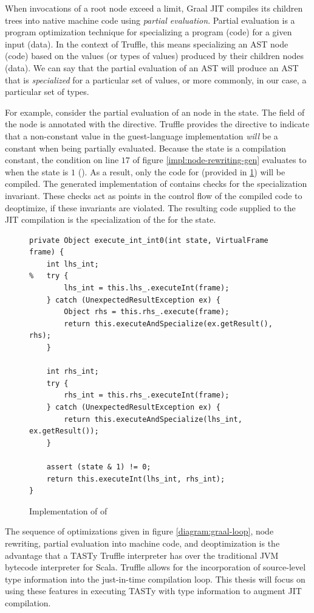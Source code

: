 When invocations of a root node exceed a limit, Graal JIT compiles its children trees into native machine code using \textit{partial evaluation}.
Partial evaluation is a program optimization technique for specializing a program (code) for a given input (data)\cite{futamura:partial-eval}.
In the context of Truffle, this means specializing an AST node (code) based on the values (or types of values) produced by their children nodes (data)\cite{truffle:partial-eval}.
We can say that the partial evaluation of an AST  will produce an AST that is \textit{specialized} for a particular set of values, or more commonly, in our case, a particular set of types.

For example, consider the partial evaluation of an  node in the  state.
The  field of the node is annotated with the  directive.
Truffle provides the  directive to indicate that a non-constant value in the guest-language implementation \textit{will} be a constant when being partially evaluated.
Because the state is a compilation constant, the condition on line $17$ of figure \ref{impl:node-rewriting-gen} evaluates to  when the state is $1$ ().
As a result, only the code for  (provided in \ref{impl:node-rewriting-state2}) will be compiled.
The generated implementation of  contains checks for the specialization invariant.
These checks act as points in the control flow of the compiled code to deoptimize, if these invariants are violated.
The resulting code supplied to the JIT compilation is the specialization of the  for the  state.

\begin{figure}[!htb]
\begin{verbatim}
private Object execute_int_int0(int state, VirtualFrame frame) {
	int lhs_int;
%	try {
		lhs_int = this.lhs_.executeInt(frame);
	} catch (UnexpectedResultException ex) {
		Object rhs = this.rhs_.execute(frame);
		return this.executeAndSpecialize(ex.getResult(), rhs);
	}
	
	int rhs_int;
	try {
		rhs_int = this.rhs_.executeInt(frame);
	} catch (UnexpectedResultException ex) {
		return this.executeAndSpecialize(lhs_int, ex.getResult());
	}
	
	assert (state & 1) != 0;
	return this.executeInt(lhs_int, rhs_int);
}
\end{verbatim}
\caption{Implementation of  of }
\label{impl:node-rewriting-state2}
\end{figure}

The sequence of optimizations given in figure \ref{diagram:graal-loop}, node rewriting, partial evaluation into machine code, and deoptimization is the advantage that a TASTy Truffle interpreter has over the traditional JVM bytecode interpreter for Scala.
Truffle allows for the incorporation of source-level type information into the just-in-time compilation loop.
This thesis will focus on using these features in executing TASTy with type information to augment JIT compilation.

